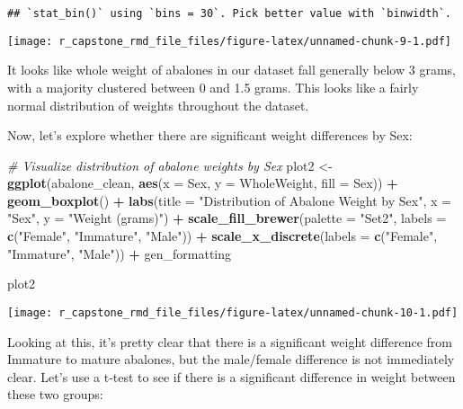 \documentclass[
]{article}
\newenvironment{Shaded}{\begin{snugshade}}{\end{snugshade}}
\newcommand{\AttributeTok}[1]{\textcolor[rgb]{0.13,0.29,0.53}{#1}}
\newcommand{\CommentTok}[1]{\textcolor[rgb]{0.56,0.35,0.01}{\textit{#1}}}
\newcommand{\FunctionTok}[1]{\textcolor[rgb]{0.13,0.29,0.53}{\textbf{#1}}}
\newcommand{\NormalTok}[1]{#1}
\newcommand{\OtherTok}[1]{\textcolor[rgb]{0.56,0.35,0.01}{#1}}
\newcommand{\SpecialCharTok}[1]{\textcolor[rgb]{0.81,0.36,0.00}{\textbf{#1}}}
\newcommand{\StringTok}[1]{\textcolor[rgb]{0.31,0.60,0.02}{#1}}
\begin{document}
\begin{verbatim}
## `stat_bin()` using `bins = 30`. Pick better value with `binwidth`.
\end{verbatim}

\texttt{[image: r\_capstone\_rmd\_file\_files/figure-latex/unnamed-chunk-9-1.pdf]}

It looks like whole weight of abalones in our dataset fall generally
below 3 grams, with a majority clustered between 0 and 1.5 grams. This
looks like a fairly normal distribution of weights throughout the
dataset.

Now, let's explore whether there are significant weight differences by
Sex:

\begin{Shaded}
\begin{Highlighting}[]
\CommentTok{\# Visualize distribution of abalone weights by Sex}
\NormalTok{plot2 }\OtherTok{\textless{}{-}} \FunctionTok{ggplot}\NormalTok{(abalone\_clean, }\FunctionTok{aes}\NormalTok{(}\AttributeTok{x =}\NormalTok{ Sex, }\AttributeTok{y =}\NormalTok{ WholeWeight, }\AttributeTok{fill =}\NormalTok{ Sex)) }\SpecialCharTok{+} 
  \FunctionTok{geom\_boxplot}\NormalTok{() }\SpecialCharTok{+} 
  \FunctionTok{labs}\NormalTok{(}\AttributeTok{title =} \StringTok{"Distribution of Abalone Weight by Sex"}\NormalTok{,}
       \AttributeTok{x =} \StringTok{"Sex"}\NormalTok{,}
       \AttributeTok{y =} \StringTok{"Weight (grams)"}\NormalTok{) }\SpecialCharTok{+}
  \FunctionTok{scale\_fill\_brewer}\NormalTok{(}\AttributeTok{palette =} \StringTok{"Set2"}\NormalTok{, }\AttributeTok{labels =} \FunctionTok{c}\NormalTok{(}\StringTok{"Female"}\NormalTok{, }\StringTok{"Immature"}\NormalTok{, }\StringTok{"Male"}\NormalTok{)) }\SpecialCharTok{+}
  \FunctionTok{scale\_x\_discrete}\NormalTok{(}\AttributeTok{labels =} \FunctionTok{c}\NormalTok{(}\StringTok{"Female"}\NormalTok{, }\StringTok{"Immature"}\NormalTok{, }\StringTok{"Male"}\NormalTok{)) }\SpecialCharTok{+}
\NormalTok{  gen\_formatting}
  
\NormalTok{plot2 }
\end{Highlighting}
\end{Shaded}

\texttt{[image: r\_capstone\_rmd\_file\_files/figure-latex/unnamed-chunk-10-1.pdf]}

Looking at this, it's pretty clear that there is a significant weight
difference from Immature to mature abalones, but the male/female
difference is not immediately clear. Let's use a t-test to see if there
is a significant difference in weight between these two groups:
\end{document}
